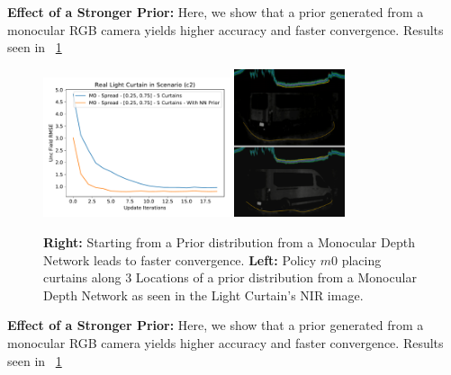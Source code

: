 \textbf{Effect of a Stronger Prior:} Here, we show that a prior generated from a monocular RGB camera yields higher accuracy and faster convergence. Results seen in ~\ref{fig:prior} 

\begin{figure}[h]
   \centering
   \begin{minipage}{0.5\textwidth}
       \centering
       \includegraphics[width=0.49\textwidth]{figures/figure_X.pdf}
       \includegraphics[width=0.29\textwidth]{figures/placement3.png}
   \end{minipage}\hfill
   \centering
   \caption{ \textbf{Right:} Starting from a Prior distribution from a Monocular Depth Network leads to faster convergence. \textbf{Left:} Policy $m0$ placing curtains along 3 Locations of a prior distribution from a Monocular Depth Network as seen in the Light Curtain's NIR image.}
   \label{fig:prior} 
\end{figure}

\textbf{Effect of a Stronger Prior:} Here, we show that a prior generated from a monocular RGB camera yields higher accuracy and faster convergence. Results seen in ~\ref{fig:prior} 

